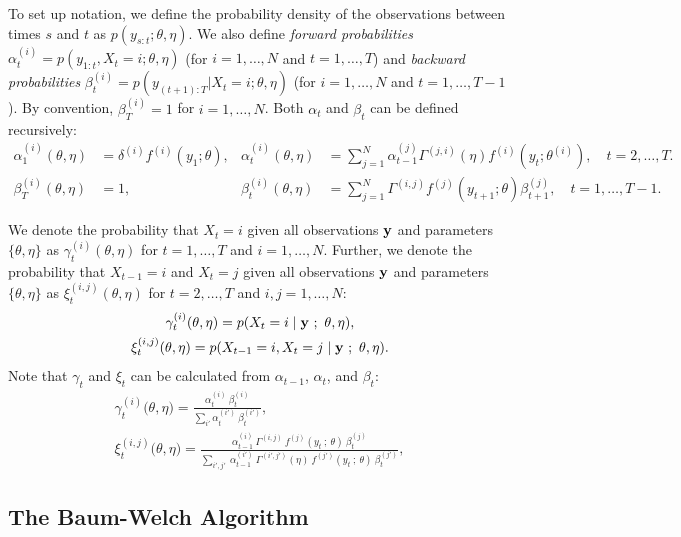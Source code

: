 To set up notation, we define the probability density of the observations between times $s$ and $t$ as $p(y_{s:t};\theta,\eta)$. We also define \textit{forward probabilities} $\alpha^{(i)}_t = p(y_{1:t},X_t = i;\theta,\eta)$ (for $i = 1,\ldots,N$ and $t = 1,\ldots,T$) and \textit{backward probabilities} $\beta^{(i)}_t = p(y_{(t+1):T}|X_t = i;\theta,\eta)$ (for $i = 1,\ldots,N$ and $t = 1,\ldots,T-1$). By convention, $\beta^{(i)}_T = 1$ for $i = 1,\ldots,N$. 
Both $\alpha_t$ and $\beta_t$ can be defined recursively:
%
\begin{align*}
    \alpha_1^{(i)}(\theta,\eta) &= \delta^{(i)} f^{(i)}(y_1;\theta), & \alpha_t^{(i)}(\theta,\eta) &= \sum_{j=1}^N \alpha_{t-1}^{(j)} \Gamma^{(j,i)}(\eta) f^{(i)}(y_t;\theta^{(i)}), \quad t = 2,\ldots,T.\\
    \beta_T^{(i)}(\theta,\eta) &= 1, & \beta_t^{(i)}(\theta,\eta) &= \sum_{j=1}^N \Gamma^{(i,j)} f^{(j)}(y_{t+1};\theta) \beta^{(j)}_{t+1}, \quad t = 1,\ldots,T-1.
\end{align*}

We denote the probability that $X_t = i$ given all observations $\mathbf{y}$ and parameters $\{\theta,\eta\}$ as $\gamma_t^{(i)}(\theta,\eta)$ for $t = 1,\ldots,T$ and $i = 1,\ldots,N$. Further, we denote the probability that $X_{t-1} = i$ and $X_t = j$ given all observations $\mathbf{y}$ and parameters $\{\theta,\eta\}$ as $\xi_t^{(i,j)}(\theta,\eta)$ for $t = 2,\ldots,T$ and $i,j = 1,\ldots,N$:
%
\begin{gather*}
    \gamma_t^{(i)}(\theta,\eta) = p(X_t = i \mid \mathbf{y} ~;~ \theta,\eta), \\ \xi_t^{(i,j)}(\theta,\eta) = p(X_{t-1} = i, X_t = j \mid \mathbf{y} ~;~ \theta,\eta). \nonumber
\end{gather*}
%
Note that $\gamma_t$ and $\xi_t$ can be calculated from $\alpha_{t-1}$, $\alpha_t$, and $\beta_t$:
%
\begin{gather}
    \gamma_{t}^{(i)}\big(\theta,\eta\big) = \frac{\alpha_{t}^{(i)} ~ \beta_{t}^{(i)}}{\sum_{i'} \alpha_{t}^{(i')} ~ \beta_{t}^{(i')}}, \label{eqn:gamma} \\
    \xi_{t}^{(i,j)}\big(\theta, \eta) = \frac{\alpha_{t-1}^{(i)} ~ \Gamma^{(i,j)} ~ f^{(j)}(y_{t} ~ ; ~\theta) ~ \beta_{t}^{(j)}}{\sum_{i',j'} ~ \alpha_{t-1}^{(i')} ~ \Gamma^{(i',j')}(\eta) ~ f^{(j')}(y_{t} ~ ; ~\theta) ~ \beta_{t}^{(j')}} \label{eqn:xi},
\end{gather}

\subsection{The Baum-Welch Algorithm}


